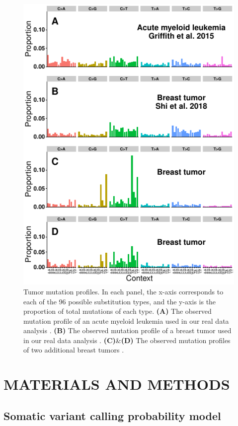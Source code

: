 \documentclass[a4,center,fleqn]{NAR}
\begin{document}
\begin{figure}
  \begin{center}
  \includegraphics{figures/real_signatures_only.pdf}
  \end{center}
  \caption{Tumor mutation profiles.
  In each panel, the x-axis corresponds to each of the 96 possible substitution types, and the y-axis is the proportion of total mutations of each type.
  \textbf{(A)} The observed mutation profile of an acute myeloid leukemia used in our real data analysis \cite{Griffith2015}.
  \textbf{(B)} The observed mutation profile of a breast tumor used in our real data analysis \cite{Shi2018}.
  \textbf{(C)}\&\textbf{(D)} The observed mutation profiles of two additional breast tumors \cite{Alexandrov2019}.
   }
  \label{NAR-realsigfig}
 \end{figure}

\section{MATERIALS AND METHODS}
\subsection{Somatic variant calling probability model}
\end{document}

